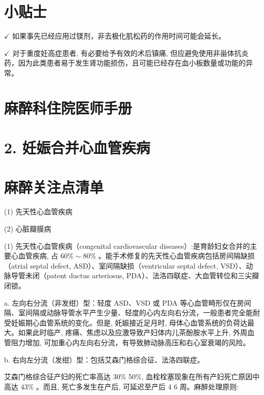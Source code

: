 \documentclass[10pt]{article}
\begin{document}
\section*{小贴士}
$\checkmark$ 如果事先已经应用过镁剂，非去极化肌松药的作用时间可能会延长。

$\checkmark$ 对于重度妊高症患者, 有必要给予有效的术后镇痛, 但应避免使用非甾体抗炎药，因为此类患者易于发生肾功能损伤，且可能已经存在血小板数量或功能的异常。

\section*{麻醉科住院医师手册}
\section*{2. 妊娠合并心血管疾病}
\section*{麻醉关注点清单}
(1) 先天性心血管疾病

(2) 心脏瓣膜病

(1) 先天性心血管疾病（congenital cardiovascular diseases）:是育龄妇女合并的主要心血管疾病, 占 $60 \% \sim 80 \%$ 。能手术修复的先天性心血管疾病包括房间隔缺损（atrial septal defect, ASD）、室间隔缺损（ventricular septal defect, VSD）、动脉导管未闭（patent ductus arteriosus, PDA）、法洛四联症、大血管转位和三尖瓣闭锁。

a. 左向右分流（非发绀）型：轻度 ASD、VSD 或 PDA 等心血管畸形仅在房间隔、室间隔或动脉导管水平产生少量、轻度的心内左向右分流，一般患者完全能耐受妊娠期心血管系统的变化。但是, 奼娠接近足月时, 母体心血管系统的负荷达最大。如果此时临产, 疼痛、焦虑以及应激导致产妇体内儿茶酚胺水平上升, 外周血管阻力增加, 可加重心内左向右分流，有导致肺动脉高压和右心室衰竭的风险。

b. 右向左分流（发绀）型：包括艾森门格综合征、法洛四联症。

艾森门格综合征产妇的死亡率高达 30\% 50\%, 血栓栓塞现象在所有产妇死亡原因中高达 $43 \%$ 。而且, 死亡多发生在产后, 可延迟至产后 4 6 周。麻醉处理原则:
\end{document}
